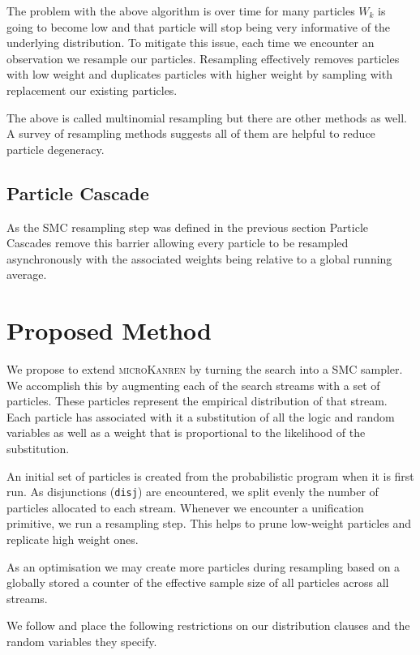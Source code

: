 \documentclass[
]{ceurart}
\begin{document}
The problem with the above algorithm is over time for many particles
$W_k$ is going to become low and that particle will stop being very
informative of the underlying distribution. To mitigate this issue,
each time we encounter an observation we resample our particles. Resampling
effectively removes particles with low weight and duplicates particles
with higher weight by sampling with replacement our existing particles.

The above is called multinomial resampling but there are other methods
as well. A survey\cite{douc2005comparison} of resampling methods
suggests all of them are helpful to reduce particle degeneracy.

\subsection{Particle Cascade}

As the SMC resampling step was defined in the previous section
Particle Cascades \cite{PaigeWDT14} remove this barrier allowing
every particle to be resampled asynchronously with the associated
weights being relative to a global running average. %

\section{Proposed Method}

We propose to extend \textsc{microKanren} by turning the search into a
SMC sampler. We accomplish this by augmenting each of the search
streams with a set of particles. These particles represent the
empirical distribution of that stream. Each particle has associated
with it a substitution of all the logic and random variables as well
as a weight that is proportional to the likelihood of the
substitution.

An initial set of particles is created from the probabilistic program
when it is first run. As disjunctions (\texttt{disj}) are encountered,
we split evenly the number of particles allocated to each stream. Whenever
we encounter a unification primitive, we run a resampling step. This
helps to prune low-weight particles and replicate high weight ones.

As an optimisation we may create more particles during resampling
based on a globally stored a counter of the effective sample size of
all particles across all streams.

We follow \cite{gutmann2010extending} and place the following restrictions
on our distribution clauses and the random variables they specify.
\end{document}
